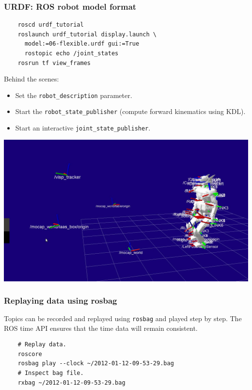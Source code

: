 \documentclass[hyperref={pdfpagelabels=false}]{beamer}
\begin{document}
\begin{frame}[fragile]
  \frametitle{URDF: ROS robot model format}

  \begin{verbatim}
    roscd urdf_tutorial
    roslaunch urdf_tutorial display.launch \
      model:=06-flexible.urdf gui:=True
      rostopic echo /joint_states
    rosrun tf view_frames
  \end{verbatim}

  Behind the scenes:
  \begin{itemize}
    \item Set the \texttt{robot\_description} parameter.
    \item Start the \texttt{robot\_state\_publisher} (compute forward
      kinematics using KDL).
    \item Start an interactive \texttt{joint\_state\_publisher}.
  \end{itemize}
\end{frame}

\begin{frame}[fragile]
\includegraphics[width=\linewidth]{rviz-full.jpg}
\end{frame}


\begin{frame}[fragile]
  \frametitle{Replaying data using rosbag}

  Topics can be recorded and replayed using \texttt{rosbag} and played
  step by step. The ROS time API ensures that the time data will
  remain consistent.

  \begin{verbatim}
    # Replay data.
    roscore
    rosbag play --clock ~/2012-01-12-09-53-29.bag
    # Inspect bag file.
    rxbag ~/2012-01-12-09-53-29.bag
  \end{verbatim}

\end{frame}
\end{document}
